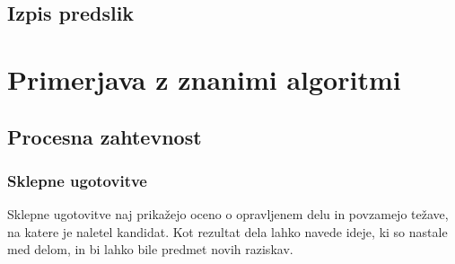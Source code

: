 \documentclass[12pt,a4paper,openany]{book}
\begin{document}
\section{Izpis predslik}


\chapter{Primerjava z znanimi algoritmi}

\section{Procesna zahtevnost}


\subsection{Sklepne ugotovitve}

Sklepne ugotovitve naj prikažejo oceno o opravljenem delu in povzamejo težave, na katere je naletel kandidat. Kot rezultat dela
lahko navede ideje, ki so nastale med delom, in bi lahko bile predmet novih raziskav.

\newpage


\appendix


\newpage

\listoffigures

\newpage

\listoftables



\newpage


\label{stran_literatura}
 
\end{document}
